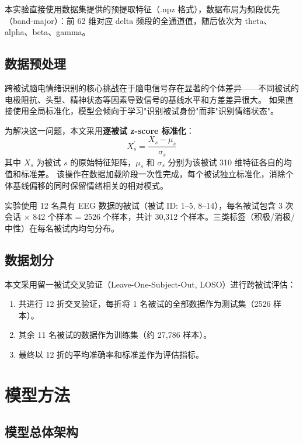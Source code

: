 \documentclass[12pt,a4paper]{ctexart}
\begin{document}
本实验直接使用数据集提供的预提取特征（.npz 格式），数据布局为频段优先（band-major）：前 62 维对应 delta 频段的全通道值，随后依次为 theta、alpha、beta、gamma。

\subsection{数据预处理}

跨被试脑电情绪识别的核心挑战在于脑电信号存在显著的个体差异——不同被试的电极阻抗、头型、精神状态等因素导致信号的基线水平和方差差异很大。
如果直接使用全局标准化，模型会倾向于学习"识别被试身份"而非"识别情绪状态"。

为解决这一问题，本文采用\textbf{逐被试 z-score 标准化}：
\begin{equation}
    X_{s}^{\prime} = \frac{X_{s} - \mu_{s}}{\sigma_{s}}
\end{equation}
其中 $X_{s}$ 为被试 $s$ 的原始特征矩阵，$\mu_s$ 和 $\sigma_s$ 分别为该被试 310 维特征各自的均值和标准差。
该操作在数据加载阶段一次性完成，每个被试独立标准化，消除个体基线偏移的同时保留情绪相关的相对模式。

实验使用 12 名具有 EEG 数据的被试（被试 ID: 1--5, 8--14），每名被试包含 3 次会话 $\times$ 842 个样本 = 2526 个样本，共计 30,312 个样本。三类标签（积极/消极/中性）在每名被试内均匀分布。

\subsection{数据划分}

本文采用留一被试交叉验证（Leave-One-Subject-Out, LOSO）进行跨被试评估：
\begin{enumerate}[itemsep=0pt]
    \item 共进行 12 折交叉验证，每折将 1 名被试的全部数据作为测试集（2526 样本）。
    \item 其余 11 名被试的数据作为训练集（约 27,786 样本）。
    \item 最终以 12 折的平均准确率和标准差作为评估指标。
\end{enumerate}


\section{模型方法}

\subsection{模型总体架构}
\end{document}
